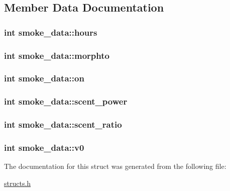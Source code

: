 \subsection{Member Data Documentation}
\hypertarget{structsmoke__data_aaf3866b012d5294aa2e6100f71e6815f}{
\subsubsection[{hours}]{\setlength{\rightskip}{0pt plus 5cm}int smoke\-\_\-data\-::hours}}\label{structsmoke__data_aaf3866b012d5294aa2e6100f71e6815f}
\hypertarget{structsmoke__data_a8eadb9e965e93cd2b445df5a07947597}{
\subsubsection[{morphto}]{\setlength{\rightskip}{0pt plus 5cm}int smoke\-\_\-data\-::morphto}}\label{structsmoke__data_a8eadb9e965e93cd2b445df5a07947597}
\hypertarget{structsmoke__data_a72d69564d6a635fc5a4af9bbbe958dcd}{
\subsubsection[{on}]{\setlength{\rightskip}{0pt plus 5cm}int smoke\-\_\-data\-::on}}\label{structsmoke__data_a72d69564d6a635fc5a4af9bbbe958dcd}
\hypertarget{structsmoke__data_a1357ca79de903215e0a4a8ea74d76779}{
\subsubsection[{scent\-\_\-power}]{\setlength{\rightskip}{0pt plus 5cm}int smoke\-\_\-data\-::scent\-\_\-power}}\label{structsmoke__data_a1357ca79de903215e0a4a8ea74d76779}
\hypertarget{structsmoke__data_af58080ad5cfb641f831c614418ecf7c3}{
\subsubsection[{scent\-\_\-ratio}]{\setlength{\rightskip}{0pt plus 5cm}int smoke\-\_\-data\-::scent\-\_\-ratio}}\label{structsmoke__data_af58080ad5cfb641f831c614418ecf7c3}
\hypertarget{structsmoke__data_ab9e0ec5cf6432e73e937d3fec4c694df}{
\subsubsection[{v0}]{\setlength{\rightskip}{0pt plus 5cm}int smoke\-\_\-data\-::v0}}\label{structsmoke__data_ab9e0ec5cf6432e73e937d3fec4c694df}


The documentation for this struct was generated from the following file\-:\begin{DoxyCompactItemize}
\item 
\hyperlink{structs_8h}{structs.\-h}\end{DoxyCompactItemize}
